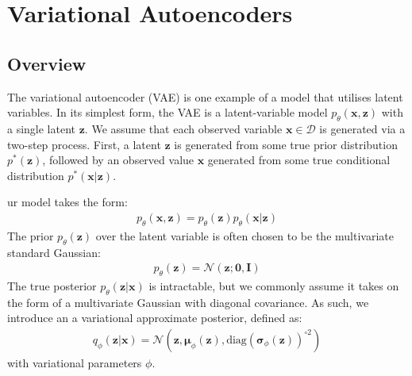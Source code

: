 \documentclass[ oneside,%
                    author={George Herbert},
                    degree={MSci},
                     title={Video Diffusion Models for Climate Simulations},
                  subtitle={}]{dissertation}
\begin{document}
\section{Variational Autoencoders}
\label{sec:background_vae}


\subsection{Overview}
\label{sec:background_vae_latent}

The variational autoencoder (VAE) \cite{Autoencoding_Variational_Bayes_Kingma,Stochastic_Backpropagation_Rezende} is one example of a model that utilises latent variables. In its simplest form, the VAE is a latent-variable model $p_\theta(\mathbf{x},\mathbf{z})$ with a single latent $\mathbf{z}$. We assume that each observed variable $\mathbf{x}\in\mathcal{D}$ is generated via a two-step process. First, a latent $\mathbf{z}$ is generated from some true prior distribution $p^*(\mathbf{z})$, followed by an observed value $\mathbf{x}$ generated from some true conditional distribution $p^*(\mathbf{x}|\mathbf{z})$. 

ur model takes the form:
\begin{align}
      p_\theta(\mathbf{x},\mathbf{z})=p_\theta(\mathbf{z})p_\theta(\mathbf{x}|\mathbf{z})
\end{align}
The prior $p_\theta(\mathbf{z})$ over the latent variable is often chosen to be the multivariate standard Gaussian:
\begin{align}
      p_\theta(\mathbf{z})=\mathcal{N}(\mathbf{z};\mathbf{0}, \mathbf{I})
\end{align}
The true posterior $p_\theta(\mathbf{z}|\mathbf{x})$ is intractable, but we commonly assume it takes on the form of a multivariate Gaussian with diagonal covariance. As such, we introduce an a variational approximate posterior, defined as:
\begin{align}
      q_\phi(\mathbf{z}|\mathbf{x})=\mathcal{N}(\mathbf{z}, \boldsymbol{\mu}_\phi(\mathbf{z}), \mathrm{diag}(\boldsymbol\sigma_\phi(\mathbf{z}))^{\circ 2})
\end{align}
with variational parameters $\phi$.
\end{document}
